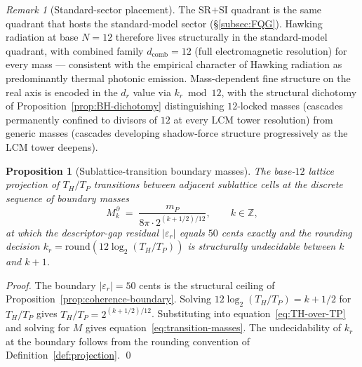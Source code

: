 \documentclass[11pt,a4paper]{article}
\newtheorem{proposition}[theorem]{Proposition}
\theoremstyle{definition}
\theoremstyle{remark}
\newtheorem{remark}[theorem]{Remark}
\begin{document}
\begin{remark}[Standard-sector placement]\label{rem:hawking-standard-sector}
The SR$+$SI quadrant is the same quadrant that hosts the standard-model sector (\S\ref{subsec:FQG}). Hawking radiation at base $N=12$ therefore lives structurally in the standard-model quadrant, with combined family $d_{\text{comb}} = 12$ (full electromagnetic resolution) for every mass --- consistent with the empirical character of Hawking radiation as predominantly thermal photonic emission. Mass-dependent fine structure on the real axis is encoded in the $d_{r}$ value via $k_{r} \bmod 12$, with the structural dichotomy of Proposition~\ref{prop:BH-dichotomy} distinguishing $12$-locked masses (cascades permanently confined to divisors of $12$ at every LCM tower resolution) from generic masses (cascades developing shadow-force structure progressively as the LCM tower deepens).
\end{remark}

\begin{proposition}[Sublattice-transition boundary masses]\label{prop:transition-masses}
The base-$12$ lattice projection of $T_{H}/T_{P}$ transitions between adjacent sublattice cells at the discrete sequence of boundary masses
\begin{equation}\label{eq:transition-masses}
M_{k}^{\partial} \;=\; \frac{m_{P}}{8\pi \cdot 2^{(k+1/2)/12}}, \qquad k \in \mathbb{Z},
\end{equation}
at which the descriptor-gap residual $|\varepsilon_{r}|$ equals $50$ cents exactly and the rounding decision $k_{r} = \mathrm{round}(12 \log_{2}(T_{H}/T_{P}))$ is structurally undecidable between $k$ and $k+1$.
\end{proposition}

\begin{proof}
The boundary $|\varepsilon_{r}| = 50$ cents is the structural ceiling of Proposition~\ref{prop:coherence-boundary}. Solving $12 \log_{2}(T_{H}/T_{P}) = k + 1/2$ for $T_{H}/T_{P}$ gives $T_{H}/T_{P} = 2^{(k+1/2)/12}$. Substituting into equation~\eqref{eq:TH-over-TP} and solving for $M$ gives equation~\eqref{eq:transition-masses}. The undecidability of $k_{r}$ at the boundary follows from the rounding convention of Definition~\ref{def:projection}. \qed
\end{proof}
\end{document}

